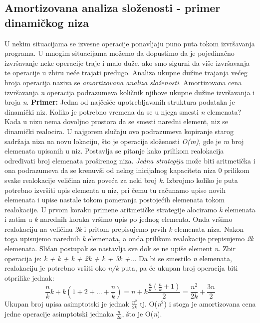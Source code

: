 \documentclass{article}
\begin{document}
\subsection{Amortizovana analiza složenosti - primer dinamičkog niza}
U nekim situacijama se izvesne operacije ponavljaju puno puta tokom izvršavanja
programa. U mnogim situacijama možemo da dopustimo da je pojedinačno
izvršavanje neke operacije traje i malo duže, ako smo sigurni da više izvršavanja
te operacije u zbiru neće trajati predugo. Analiza ukupne dužine trajanja većeg
broja operacija naziva se \textit{amortizovana analiza složenosti}. \newline Amortizovana cena
izvršavanja \textit{n} operacija podrazumeva količnik njihove ukupne dužine izvršavanja i broja \textit{n}.
\newline \textbf{Primer:}
Jedna od najčešće upotrebljavanih struktura podataka je dinamički niz. Koliko je potrebno vremena da se u njega smesti \textit{n} elemenata?
\newline Kada u nizu
nema dovoljno prostora da se smesti naredni element, niz se dinamički realocira.
U najgorem slučaju ovo podrazumeva kopiranje starog sadržaja niza na novu
lokaciju, što je operacija složenosti \textit{O(m)}, gde je \textit{m} broj elemenata upisanih u
niz. Postavlja se pitanje kako prilikom realokacija određivati broj elemenata
proširenog niza.
\newline \textit{Jedna strategija} može biti aritmetička i ona podrazumeva da se krenuvši od nekog
inicijalnog kapaciteta niza 0 prilikom svake realokacije veličina niza poveća za
neki broj \textit{k}. Izbrojmo koliko je puta potrebno izvršiti upis elementa u niz, pri čemu tu računamo upise novih elemenata
i upise nastale tokom pomeranja postojećih elemenata tokom realokacije. U
prvom koraku primene aritmetičke strategije alociramo \textit{k} elemenata i zatim u \textit{k}
narednih koraka vršimo upis po jednog elementa. Onda vršimo realokaciju na
veličinu \textit{2k} i pritom prepisujemo prvih \textit{k} elemenata niza. Nakon toga upisujemo
narednih \textit{k} elemenata, a onda prilikom realokacije prepisujemo \textit{2k} elemenata.
Sličan postupak se nastavlja sve dok se ne upiše element \textit{n}. Zbir operacija je: \textit{k + k + k + 2k + k + 3k +...} Da bi se smestilo \textit{n} elemenata,
realokaciju je potrebno vršiti oko \textit{n/k} puta, pa će ukupan broj operacija biti
otprilike jednak:
$$ \frac{n}{k}k + k(1+2+...+\frac{n}{k}) = n + k\frac{\frac{n}{k}(\frac{n}{k}+1)}{2} = \frac{n^2}{2k} + \frac{3n}{2} $$
Ukupan broj upisa asimptotski je jednak $\frac{n^2}{2k}$ tj. O(\textit{n}$^2$) i stoga je amortizovana cena jedne operacije asimptotski jednaka $\frac{n}{2k}$, što je O(\textit{n}).
\end{document}
